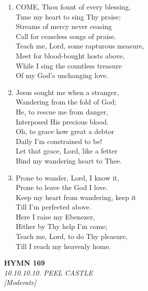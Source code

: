 \documentclass[11pt,a4paper]{article}
\begin{document}
\begin{enumerate}
    \item COME, Thou fount of every blessing, \\
        Tune my heart to sing Thy praise; \\
        Streams of mercy never ceasing \\
        Call for ceaseless songs of praise. \\
        Teach me, Lord, some rapturous measure, \\
        Meet for blood-bought hosts above, \\
        While I sing the countless treasure \\
        Of my God's unchanging love.

    \item Jesus sought me when a stranger, \\
        Wandering from the fold of God; \\
        He, to rescue me from danger, \\
        Interposed His precious blood. \\
        Oh, to grace how great a debtor \\
        Daily I'm constrained to be! \\
        Let that grace, Lord, like a fetter \\
        Bind my wandering heart to Thee.

    \item Prone to wander, Lord, I know it, \\
        Prone to leave the God I love. \\
        Keep my heart from wandering, keep it \\
        Till I'm perfected above. \\
        Here I raise my Ebenezer, \\
        Hither by Thy help I'm come; \\
        Teach me, Lord, to do Thy pleasure, \\
        Till I reach my heavenly home.

\end{enumerate}

\newpage
\begin{center}
    {\Large \textbf{HYMN 169}}
    \\
    \textit{10.10.10.10. PEEL CASTLE}
    \\
    \textit{\small [Moderate]}
\end{center}
\vspace{1em}
\end{document}
